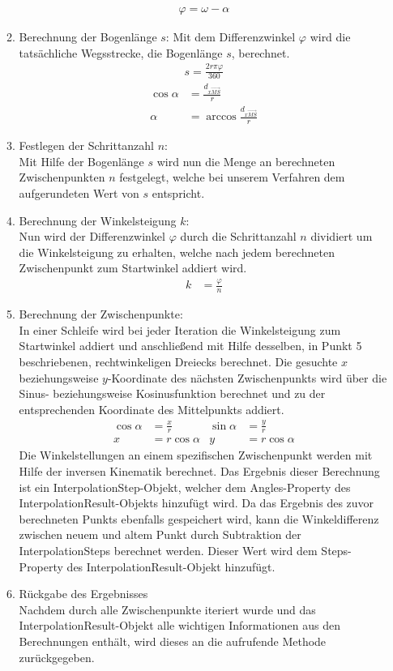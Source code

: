 \begin{itemize}
\begin{enumerate}
\begin{align*}
\varphi = \omega - \alpha
\end{align*}
\item Berechnung der Bogenlänge $s$:
Mit dem Differenzwinkel $\varphi$ wird die tatsächliche Wegsstrecke, die Bogenlänge $s$, berechnet.
\begin{align*}
s = \frac{2r \pi \varphi}{360}
\end{align*}
\begin{align*}
\cos \alpha & = \frac{d_{x\overrightarrow{MS}}}{r}\\
\alpha & = \arccos \frac{d_{x\overrightarrow{MS}}}{r}
\end{align*}
\item Festlegen der Schrittanzahl $n$:\\
Mit Hilfe der Bogenlänge $s$ wird nun die Menge an berechneten Zwischenpunkten $n$ festgelegt, welche bei unserem Verfahren dem aufgerundeten Wert von  $s$ entspricht.
\item Berechnung der Winkelsteigung $k$:\\
Nun wird der Differenzwinkel $\varphi$ durch die Schrittanzahl $n$ dividiert um die Winkelsteigung zu erhalten, welche nach jedem berechneten Zwischenpunkt zum Startwinkel addiert wird.
\begin{align*}
k & = \frac{\varphi}{n}
\end{align*}
\newpage
\item Berechnung der Zwischenpunkte:\\
In einer Schleife wird bei jeder Iteration die Winkelsteigung zum Startwinkel addiert und anschließend mit Hilfe desselben, in Punkt 5 beschriebenen, rechtwinkeligen Dreiecks berechnet. Die gesuchte $x$ beziehungsweise $y$-Koordinate des nächsten Zwischenpunkts wird über die Sinus- beziehungsweise Kosinusfunktion berechnet und zu der entsprechenden Koordinate des Mittelpunkts addiert.
\begin{align*}
\cos \alpha & = \frac{x}{r} & \sin \alpha & = \frac{y}{r}\\
x & = r \cos \alpha & y & = r \cos \alpha
\end{align*}
Die Winkelstellungen an einem spezifischen Zwischenpunkt werden mit Hilfe der inversen Kinematik berechnet. Das Ergebnis dieser Berechnung ist ein InterpolationStep-Objekt, welcher dem Angles-Property des InterpolationResult-Objekts hinzufügt wird. Da das Ergebnis des zuvor berechneten Punkts ebenfalls gespeichert wird, kann die Winkeldifferenz zwischen neuem und altem Punkt durch Subtraktion der InterpolationSteps berechnet werden. Dieser Wert wird dem Steps-Property des InterpolationResult-Objekt hinzufügt.
\item Rückgabe des Ergebnisses\\
Nachdem durch alle Zwischenpunkte iteriert wurde und das InterpolationResult-Objekt alle wichtigen Informationen aus den Berechnungen enthält, wird dieses an die aufrufende Methode zurückgegeben.
\end{enumerate}


\end{itemize}

